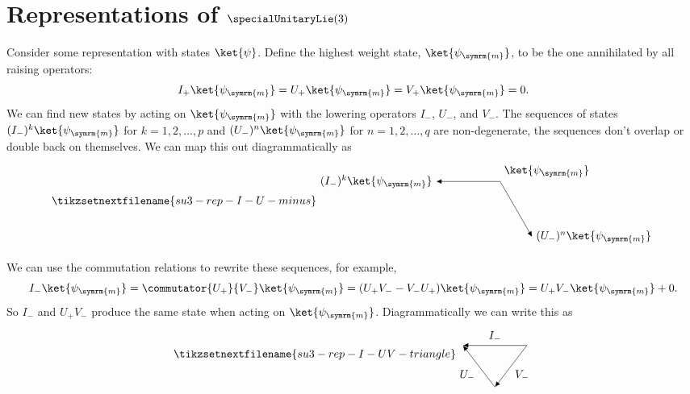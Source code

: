 \documentclass[fleqn]{NotesClass}
\begin{document}
    \section{Representations of \texorpdfstring{\(\specialUnitaryLie(3)\)}{su(3)}}
    Consider some representation with states \(\ket{\psi}\).
    Define the highest weight state, \(\ket{\psi_{\symrm{m}}}\), to be the one annihilated by all raising operators:
    \begin{equation}
        I_{+} \ket{\psi_{\symrm{m}}} = U_{+} \ket{\psi_{\symrm{m}}} = V_{+} \ket{\psi_{\symrm{m}}} = 0.
    \end{equation}
    We can find new states by acting on \(\ket{\psi_{\symrm{m}}}\) with the lowering operators \(I_-\), \(U_-\), and \(V_-\).
    The sequences of states \((I_-)^k \ket{\psi_{\symrm{m}}}\) for \(k = 1, 2, \dotsc, p\) and \((U_-)^n \ket{\psi_{\symrm{m}}}\) for \(n = 1, 2, \dotsc, q\) are non-degenerate, the sequences don't overlap or double back on themselves.
    We can map this out diagrammatically as
    \begin{equation}
        \tikzsetnextfilename{su3-rep-I-U-minus}
        \begin{tikzpicture}[
            >={Latex[width=1.5mm]},
            baseline = (current bounding box)
            ]
            \draw[->] (0, 0) node [above right] {\(\ket{\psi_{\symrm{m}}}\)} -- (-2, 0) node [left] {\((I_-)^k \ket{\psi_{\symrm{m}}}\)};
            \draw[->] (0, 0) -- (-60:2) node [right] {\((U_-)^n \ket{\psi_{\symrm{m}}}\)};
        \end{tikzpicture}
    \end{equation}
    
    We can use the commutation relations to rewrite these sequences, for example,
    \begin{equation}
        I_- \ket{\psi_{\symrm{m}}} = \commutator{U_+}{V_-} \ket{\psi_{\symrm{m}}} = (U_+ V_- - V_- U_+) \ket{\psi_{\symrm{m}}} = U_+ V_- \ket{\psi_{\symrm{m}}} + 0.
    \end{equation}
    So \(I_-\) and \(U_+ V_-\) produce the same state when acting on \(\ket{\psi_{\symrm{m}}}\).
    Diagrammatically we can write this as
    \begin{equation}
        \tikzsetnextfilename{su3-rep-I-UV-triangle}
        \begin{tikzpicture}[
            >={Latex[width=1.5mm]},
            baseline = (current bounding box)
            ]
            \draw[->] (0, 0) -- (-2, 0) node [midway, above] {\(I_-\)};
            \draw[->] (0, 0) -- (-1, -1.3) node [midway, below right] {\(V_-\)};
            \draw[->] (-1, -1.3) -- (-2, 0) node [midway, below left] {\(U_-\)};
        \end{tikzpicture}
    \end{equation}
    
\end{document}

